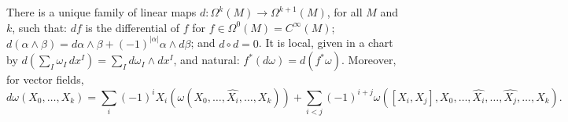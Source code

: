 \begin{theorem}\label{differential-forms:theorem-exterior-derivative}
There is a unique family of linear maps $d \colon \Omega^k(M) \to \Omega^{k+1}(M)$, for all $M$ and $k$, such that:
$df$ is the differential of $f$ for $f \in \Omega^0(M) = C^\infty(M)$; $d(\alpha \wedge \beta) = d\alpha \wedge \beta + (-1)^{|\alpha|}\alpha \wedge d\beta$; and $d \circ d = 0$. It is local, given in a chart by
$d(\sum_I\omega_I\,dx^I) = \sum_I d\omega_I \wedge dx^I$, and natural: $f^*(d\omega) = d(f^*\omega)$. Moreover, for vector fields,
\[
d\omega(X_0, \ldots, X_k) = \sum_i(-1)^i X_i\left(\omega(X_0, \ldots, \widehat{X_i}, \ldots, X_k)\right) + \sum_{i<j}(-1)^{i+j}\omega([X_i, X_j], X_0, \ldots, \widehat{X_i}, \ldots, \widehat{X_j}, \ldots, X_k).
\]
\end{theorem}

